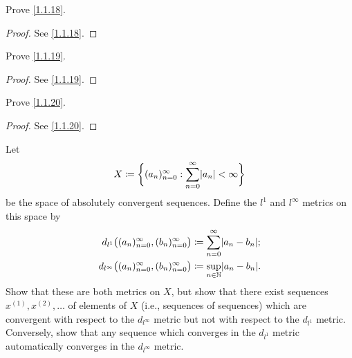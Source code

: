 \begin{ex}\label{ex:1.1.12}
  Prove \cref{1.1.18}.
\end{ex}

\begin{proof}
  See \cref{1.1.18}.
\end{proof}

\begin{ex}\label{ex:1.1.13}
  Prove \cref{1.1.19}.
\end{ex}

\begin{proof}
  See \cref{1.1.19}.
\end{proof}

\begin{ex}\label{ex:1.1.14}
  Prove \cref{1.1.20}.
\end{ex}

\begin{proof}
  See \cref{1.1.20}.
\end{proof}

\begin{ex}\label{ex:1.1.15}
  Let
  \[
    X \coloneqq \bigg\{(a_n)_{n = 0}^\infty : \sum_{n = 0}^\infty \abs{a_n} < \infty\bigg\}
  \]
  be the space of absolutely convergent sequences. Define the \(l^1\) and \(l^\infty\) metrics
  on this space by
  \begin{align*}
    d_{l^1}\big((a_n)_{n = 0}^\infty, (b_n)_{n = 0}^\infty\big)      & \coloneqq \sum_{n = 0}^\infty \abs{a_n - b_n}; \\
    d_{l^\infty}\big((a_n)_{n = 0}^\infty, (b_n)_{n = 0}^\infty\big) & \coloneqq \sup_{n \in \N} \abs{a_n - b_n}.
  \end{align*}
  Show that these are both metrics on \(X\), but show that there exist sequences \(x^{(1)}, x^{(2)}, \dots\) of elements of \(X\) (i.e., sequences of sequences) which are convergent with respect to the \(d_{l^\infty}\) metric but not with respect to the \(d_{l^1}\) metric.
  Conversely, show that any sequence which converges in the \(d_{l^1}\) metric automatically converges in the \(d_{l^\infty}\) metric.
\end{ex}

